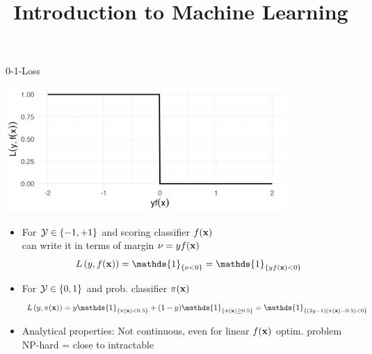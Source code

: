 \documentclass[11pt,compress,t,notes=noshow, xcolor=table]{beamer}
\title{Introduction to Machine Learning}
\begin{document}
    

\begin{vbframe}{0-1-Loss}

{
\begin{center}
\includegraphics[width = 0.8\textwidth]{figure/zero_one.png}
\end{center}
}

\vfill

\begin{itemize}
\item For $\mathcal{Y} \in \{-1, +1\}$ and scoring classifier $f(\mathbf{x})$\\
can write it in terms of margin $\nu = yf(\mathbf{x})$
$$
\Lxy = \mathds{1}_{\{\nu < 0\}} = \mathds{1}_{\{y\fx < 0\}}
$$
\item For $\mathcal{Y} \in \{0, 1\}$ and prob. classifier $\pi(\mathbf{x})$
$$
\Lpixy = y \mathds{1}_{\{\pix < 0.5\}} + (1-y) \mathds{1}_{\{\pix \geq 0.5\}} = \mathds{1}_{\{(2y-1)(\pix - 0.5) < 0 \}} 
$$
\item Analytical properties:  Not continuous, even for linear $f(\mathbf{x})$ optim. problem NP-hard = close to intractable 
\end{itemize}

\end{vbframe}
\end{document}
